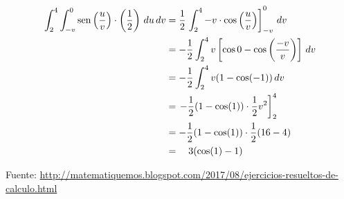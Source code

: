 \documentclass{article}
\begin{document}
\begin{align*} 
\int_2^4\int_{-v}^0\mathop{\rm sen}\nolimits{\left(\frac uv\right)}\cdot \left(\frac12\right) \,du\,dv 
& = \frac12\left.\int_2^4 -v\cdot\cos{\left(\frac uv\right)}\right]_{-v}^0\,dv \\ 
& = -\frac12\int_2^4 v\left[\cos{0}-\cos{\left(\frac{-v}{v}\right)}\right]\,dv \\ 
& = -\frac12\int_2^4 v(1-\cos(-1))\,dv \\ 
& = \left.-\frac12(1-\cos(1))\cdot\frac12 v^2\right]_2^4 \\ 
& =-\frac12(1-\cos(1))\cdot\frac12 (16-4) \\ & = \quad 3(\cos(1)-1) 
\end{align*}
\eenu
\hrulefill
\vs

Fuente: \url{http://matematiquemos.blogspot.com/2017/08/ejercicios-resueltos-de-calculo.html}
\end{document}

